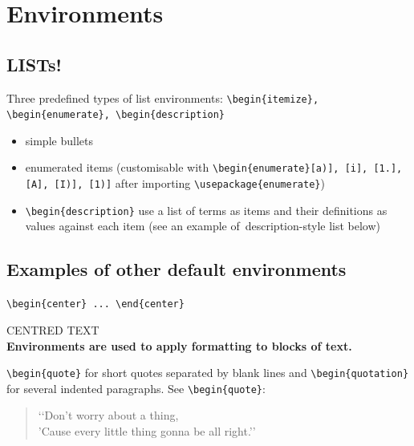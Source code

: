 \documentclass[a4paper,11pt]{article}
\begin{document}
\section{Environments}

\subsection{LISTs!}

Three predefined types of list environments: \verb|\begin{itemize}, \begin{enumerate}, \begin{description}|

\begin{itemize}
	\item simple bullets
	\item enumerated items (customisable with \verb|\begin{enumerate}[a)], [i], [1.], [A], [I)], [1)]| after importing \verb|\usepackage{enumerate}|)
	\item \verb|\begin{description}| use a list of terms as items and their definitions as values against each item (see an example of~\hypertarget{wd:descr}{description-style list} below)
\end{itemize}

\subsection{Examples of other default environments}

\verb|\begin{center} ... \end{center}|

\begin{center}
CENTRED TEXT\\
\textbf{Environments are used to apply formatting to blocks of text.}
\end{center}

\verb|\begin{quote}| for short quotes separated by blank lines and \verb|\begin{quotation}| for several indented paragraphs. See \verb|\begin{quote}|:


\begin{quote}
	\lq\lq Don't worry about a thing,\\
	'Cause every little thing gonna be all right.\rq\rq
\end{quote}
\end{document}

